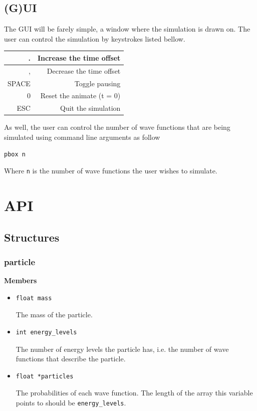 \documentclass[a4paper, 10pt]{article}
\begin{document}
    \subsection{(G)UI}
    The GUI will be farely simple, a window where the simulation is drawn on. The user can
    control the simulation by keystrokes listed bellow.
    \begin{center}
        \begin{tabular}{|r|r|}
        \hline
            . & Increase the time offset \\ \hline
            , & Decrease the time offset \\ \hline
            SPACE & Toggle pausing \\ \hline
            0 & Reset the animate (t = 0) \\ \hline
            ESC & Quit the simulation \\ \hline
        \end{tabular}
    \end{center}
    As well, the user can control the number of wave functions that are being simulated using
    command line arguments as follow
    \begin{verbatim}pbox n\end{verbatim}
    Where \verb|n| is the number of wave functions the user wishes to simulate.

\newpage
\section{API}
    \subsection{Structures}
        \subsubsection{particle}
        {\bf Members}
        \begin{itemize}
            \item \begin{verbatim}float mass\end{verbatim} The mass of the particle.
            \item \begin{verbatim}int energy_levels\end{verbatim} The number
                  of energy levels the particle has, i.e. the number of wave
                  functions that describe the particle.
            \item \begin{verbatim}float *particles\end{verbatim} The
                  probabilities of each wave function. The length of the array
                  this variable points to should be \verb|energy_levels|.
        \end{itemize}
\end{document}
